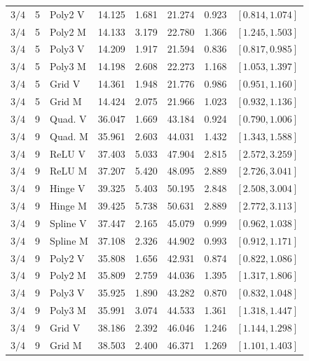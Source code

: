 \begin{longtable}{rrlrrrrr}
$3/4$ & 5 & Poly2 V & 14.125 & 1.681 & 21.274 & 0.923 & $[0.814,1.074]$\\
$3/4$ & 5 & Poly2 M & 14.133 & 3.179 & 22.780 & 1.366 & $[1.245,1.503]$\\
$3/4$ & 5 & Poly3 V & 14.209 & 1.917 & 21.594 & 0.836 & $[0.817,0.985]$\\
$3/4$ & 5 & Poly3 M & 14.198 & 2.608 & 22.273 & 1.168 & $[1.053,1.397]$\\
$3/4$ & 5 & Grid V & 14.361 & 1.948 & 21.776 & 0.986 & $[0.951,1.160]$\\
$3/4$ & 5 & Grid M & 14.424 & 2.075 & 21.966 & 1.023 & $[0.932,1.136]$\\
$3/4$ & 9 & Quad. V & 36.047 & 1.669 & 43.184 & 0.924 & $[0.790,1.006]$\\
$3/4$ & 9 & Quad. M & 35.961 & 2.603 & 44.031 & 1.432 & $[1.343,1.588]$\\
$3/4$ & 9 & ReLU V & 37.403 & 5.033 & 47.904 & 2.815 & $[2.572,3.259]$\\
$3/4$ & 9 & ReLU M & 37.207 & 5.420 & 48.095 & 2.889 & $[2.726,3.041]$\\
$3/4$ & 9 & Hinge V & 39.325 & 5.403 & 50.195 & 2.848 & $[2.508,3.004]$\\
$3/4$ & 9 & Hinge M & 39.425 & 5.738 & 50.631 & 2.889 & $[2.772,3.113]$\\
$3/4$ & 9 & Spline V & 37.447 & 2.165 & 45.079 & 0.999 & $[0.962,1.038]$\\
$3/4$ & 9 & Spline M & 37.108 & 2.326 & 44.902 & 0.993 & $[0.912,1.171]$\\
$3/4$ & 9 & Poly2 V & 35.808 & 1.656 & 42.931 & 0.874 & $[0.822,1.086]$\\
$3/4$ & 9 & Poly2 M & 35.809 & 2.759 & 44.036 & 1.395 & $[1.317,1.806]$\\
$3/4$ & 9 & Poly3 V & 35.925 & 1.890 & 43.282 & 0.870 & $[0.832,1.048]$\\
$3/4$ & 9 & Poly3 M & 35.991 & 3.074 & 44.533 & 1.361 & $[1.318,1.447]$\\
$3/4$ & 9 & Grid V & 38.186 & 2.392 & 46.046 & 1.246 & $[1.144,1.298]$\\
$3/4$ & 9 & Grid M & 38.503 & 2.400 & 46.371 & 1.269 & $[1.101,1.403]$\\
\end{longtable}
\endgroup


